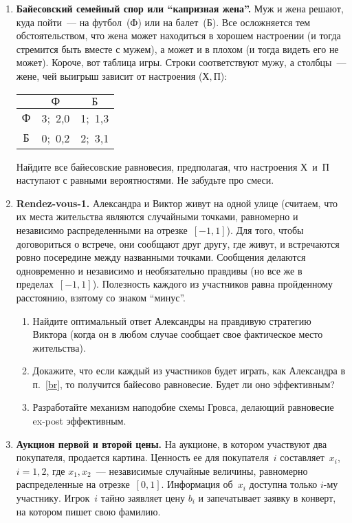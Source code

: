 \documentclass[a4paper,12pt]{article}
\def\nsk{\vspace{-2mm}}
\begin{document}
\begin{enumerate}

\item {\bf Байесовский семейный спор или ``капризная
жена''.} Муж и жена решают, куда пойти~--- на
футбол~($Ф$\/) или на балет~($Б$\/). Все осложняется тем
обстоятельством, что жена может находиться в хорошем
настроении (и тогда стремится быть вместе с мужем), а может
и в плохом (и тогда видеть его не может). Короче, вот
таблица игры. Строки соответствуют мужу, а столбцы~---
жене, чей выигрыш зависит от настроения ($Х,П$):
\nsk\begin{center}
\begin{tabular}{|c|cc|}
\hline &$Ф$&$Б$\\ \hline $Ф$&3;\ 2,0&1;\ 1,3\\ $Б$&0;\
0,2&2;\ 3,1\\ \hline
\end{tabular}
\end{center}

\nsk Найдите все байесовские равновесия, предполагая, что
настроения $Х$~и~$П$ наступают с равными вероятностями. Не
забудьте про смеси.

\item{\bf Rendez-vous-1.} Александра и Виктор живут на
одной улице (считаем, что их места жительства являются
случайными точками, равномерно и независимо распределенными
на отрезке~$[-1,1]$). Для того, чтобы договориться о
встрече, они сообщают друг другу, где живут, и встречаются
ровно посередине между названными точками. Сообщения
делаются одновременно и независимо и необязательно правдивы
(но все же в пределах~$[-1,1]$). Полезность каждого из
участников равна пройденному расстоянию, взятому со знаком
``минус''.
\begin{enumerate}
 \item\label{br} Найдите оптимальный ответ Александры на правдивую
стратегию Виктора (когда он в любом случае сообщает свое
фактическое место жительства).
 \item Докажите, что если каждый из участников будет играть, как Александра
в п.~\ref{br}, то получится байесово равновесие. Будет ли
оно эффективным?
 \item Разработайте механизм наподобие схемы Гровса, делающий
равновесие ex-post эффективным.
\end{enumerate}

\item {\bf Аукцион первой и второй цены.} На аукционе, в
котором участвуют два покупателя, продается картина.
Ценность ее для покупателя~$i$ составляет~$x_i$, $i=1,2$,
где $x_1,x_2$~--- независимые случайные величины,
равномерно распределенные на отрезке~$[0,1]$. Информация
об~$x_i$ доступна только $i$-му участнику. Игрок~$i$ тайно
заявляет цену $b_i$ и запечатывает заявку в конверт, на
котором пишет свою фамилию.


\end{enumerate}
\end{document}
